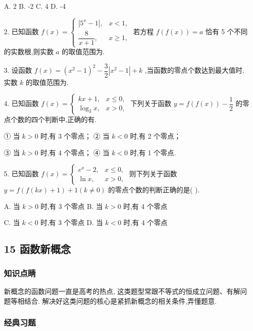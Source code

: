 A. 2 B. -2 C. 4 D. -4

2. 已知函数 $f\left( x\right)  = \left\{  \begin{array}{ll} \left| {{5}^{x} - 1}\right| , & x < 1, \\  \dfrac{8}{x + 1}, & x \geq  1, \end{array}\right.$ 若方程 $f\left( {f\left( x\right) }\right)  = a$ 恰有 5 个不同的实数根,则实数 $a$ 的取值范围为\blkda{}.

3. 设函数 $f\left( x\right)  = {\left( {x}^{2} - 1\right) }^{2} - \dfrac{3}{2}\left| {{x}^{2} - 1}\right|  + k$ ,当函数的零点个数达到最大值时,实数 $k$ 的取值范围为\blkda{}.

4. 已知函数 $f\left( x\right)  = \left\{  \begin{array}{ll} {kx} + 1, & x \leq  0, \\  {\log }_{3}x, & x > 0, \end{array}\right.$ 下列关于函数 $y = f\left( {f\left( x\right) }\right)  - \dfrac{1}{2}$ 的零点个数的四个判断中,正确的有\blkda{}.

① 当 $k > 0$ 时,有 3 个零点； ② 当 $k < 0$ 时,有 2 个零点；

③ 当 $k > 0$ 时,有 4 个零点； ④ 当 $k < 0$ 时,有 1 个零点.

5. 已知函数 $f\left( x\right)  = \left\{  \begin{array}{ll} {{e}}^{x} - 2, & x \leq  0, \\  \ln x, & x > 0, \end{array}\right.$ 则下列关于函数 $y = f\left( {f\left( {kx}\right)  + 1}\right)  + 1\left( {k \neq  0}\right)$ 的零点个数的判断正确的是(   ).

A. 当 $k > 0$ 时,有 3 个零点 B. 当 $k > 0$ 时,有 4 个零点

C. 当 $k < 0$ 时,有 3 个零点 D. 当 $k < 0$ 时,有 4 个零点

\subsection*{15 函数新概念}

\subsubsection*{知识点睛}

新概念的函数问题一直是高考的热点, 这类题型常跟不等式的恒成立问题、有解问题等相结合. 解决好这类问题的核心是紧抓新概念的相关条件,弄懂题意.

\subsubsection*{经典习题}

